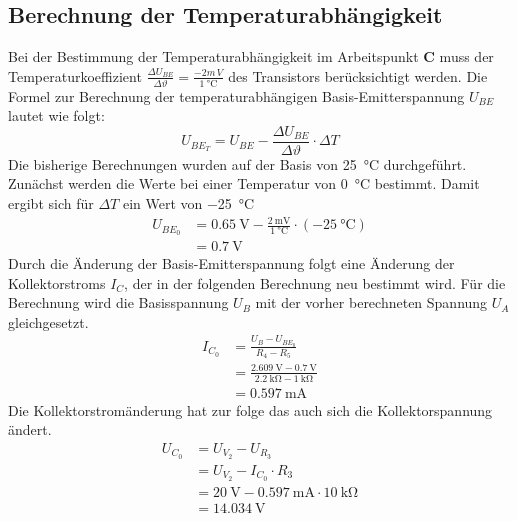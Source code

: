         \subsection{Berechnung der Temperaturabhängigkeit}
            Bei der Bestimmung der Temperaturabhängigkeit im Arbeitspunkt \textbf{C} muss der Temperaturkoeffizient \(\frac{\Delta U_{BE}}{\Delta \vartheta }= \frac{-2m\,V}{\SI{1}{\degreeCelsius}}\) des Transistors berücksichtigt werden.
            Die Formel zur Berechnung der temperaturabhängigen Basis-Emitterspannung  \(U_{BE}\)lautet wie folgt:
            \begin{equation*}
                U_{BE_T} = U_{BE}-\frac{\Delta U_{BE}}{\Delta \vartheta }\cdot \Delta T
            \end{equation*}
            Die bisherige Berechnungen wurden auf der Basis von \SI{25}{\degreeCelsius} durchgeführt. Zunächst werden die Werte bei einer Temperatur von \SI{0}{\degreeCelsius} bestimmt. Damit ergibt sich für \(\Delta T\) ein Wert von \SI{-25}{\degreeCelsius}
            \begin{align*}
                U_{BE_0}&=\SI{0.65}{\volt} - \frac{\SI{2}{\mV}}{\SI{1}{\degreeCelsius}}\cdot(\SI{-25}{\degreeCelsius})\\
                &=\SI{0.7}{\V}
            \end{align*}
            Durch die Änderung der Basis-Emitterspannung folgt eine Änderung der Kollektorstroms \(I_C\), der in der folgenden Berechnung neu bestimmt wird. 
            Für die Berechnung wird die Basisspannung \(U_B\) mit der vorher berechneten Spannung \(U_A\) gleichgesetzt.
            \begin{align*}
                I_{C_0} &= \frac{U_B-U_{BE_0}}{R_4-R_5}\\
                &=\frac{\SI{2.609}{\V}-\SI{0,7}{\V}}{\SI{2.2}{\kilo\ohm}-\SI{1}{\kilo\ohm}}\\
                &=\SI{0.597}{\milli\ampere}
            \end{align*}
            Die Kollektorstromänderung hat zur folge das auch sich die Kollektorspannung ändert. 
            \begin{align*}
                U_{C_0} &= U_{V_2}-U_{R_3}\\
                &=U_{V_2}-I_{C_0}\cdot R_3\\
                &=\SI{20}{\V}-\SI{0.597}{\milli\ampere}\cdot \SI{10}{\kilo\ohm}\\
                &=\SI{14.034}{\V}
            \end{align*}
